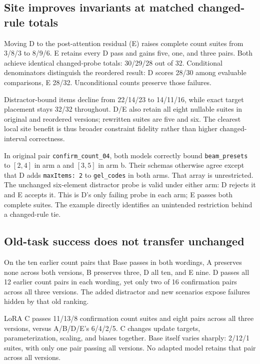 \subsection{Site improves invariants at matched changed-rule totals}
Moving D to the post-attention residual (E) raises complete count suites from 3/8/3 to 8/9/6. E retains every D pass and gains five, one, and three pairs. Both achieve identical changed-probe totals: 30/29/28 out of 32. Conditional denominators distinguish the reordered result: D scores 28/30 among evaluable comparisons, E 28/32. Unconditional counts preserve those failures.

Distractor-bound items decline from 22/14/23 to 14/11/16, while exact target placement stays 32/32 throughout. D/E also retain all eight nullable suites in original and reordered versions; rewritten suites are five and six. The clearest local site benefit is thus broader constraint fidelity rather than higher changed-interval correctness.

In original pair \texttt{confirm\_count\_04}, both models correctly bound \texttt{beam\_presets} to $[2,4]$ in arm a and $[3,5]$ in arm b. Their schemas otherwise agree except that D adds \texttt{maxItems: 2} to \texttt{gel\_codes} in both arms. That array is unrestricted. The unchanged six-element distractor probe is valid under either arm: D rejects it and E accepts it. This is D's only failing probe in each arm; E passes both complete suites. The example directly identifies an unintended restriction behind a changed-rule tie.

\subsection{Old-task success does not transfer unchanged}
On the ten earlier count pairs that Base passes in both wordings, A preserves none across both versions, B preserves three, D all ten, and E nine. D passes all 12 earlier count pairs in each wording, yet only two of 16 confirmation pairs across all three versions. The added distractor and new scenarios expose failures hidden by that old ranking.

LoRA C passes 11/13/8 confirmation count suites and eight pairs across all three versions, versus A/B/D/E's 6/4/2/5. C changes update targets, parameterization, scaling, and biases together. Base itself varies sharply: 2/12/1 suites, with only one pair passing all versions. No adapted model retains that pair across all versions.

